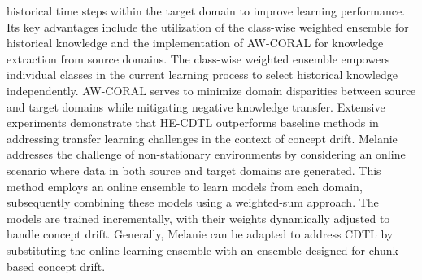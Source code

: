 historical time steps within the target domain to improve learning performance. Its key advantages include the utilization of the class-wise weighted ensemble for historical knowledge and the implementation of AW-CORAL for knowledge extraction from source domains. The class-wise weighted ensemble empowers individual classes in the current learning process to select historical knowledge independently. AW-CORAL serves to minimize domain disparities between source and target domains while mitigating negative knowledge transfer. Extensive experiments demonstrate that HE-CDTL outperforms baseline methods in addressing transfer learning challenges in the context of concept drift.
Melanie addresses the challenge of non-stationary environments by considering an online scenario where data in both source and target domains are generated. This method employs an online ensemble to learn models from each domain, subsequently combining these models using a weighted-sum approach. The models are trained incrementally, with their weights dynamically adjusted to handle concept drift. Generally, Melanie can be adapted to address CDTL by substituting the online learning ensemble with an ensemble designed for chunk-based concept drift.
